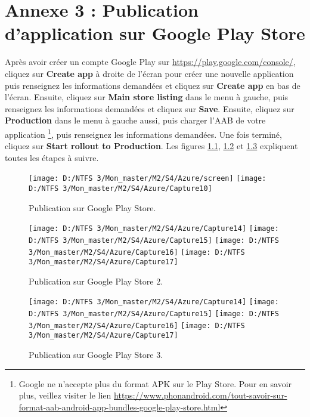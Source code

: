 \chapter{Annexe 3 : Publication d’application sur Google Play Store}
\label{chap:annexe3}

Après avoir créer un compte Google Play sur \href{https://play.google.com/console/}{https://play.google.com/console/}, cliquez sur \textbf{Create app} à droite de l'écran pour créer une nouvelle application puis renseignez les informations demandées et cliquez sur \textbf{Create app} en bas de l'écran. Ensuite, cliquez sur \textbf{Main store listing} dans le menu à gauche, puis renseignez les informations demandées et cliquez sur \textbf{Save}. Ensuite, cliquez sur \textbf{Production} dans le menu à gauche aussi, puis charger l'\gls{AAB} de votre application \footnote{Google ne n'accepte plus du format APK sur le Play Store. Pour en savoir plus, veillez visiter le lien \href{https://www.phonandroid.com/tout-savoir-sur-format-aab-android-app-bundles-google-play-store.html}{https://www.phonandroid.com/tout-savoir-sur-format-aab-android-app-bundles-google-play-store.html}}, puis renseignez les informations demandées. Une fois terminé, cliquez sur \textbf{Start rollout to Production}. Les figures \ref{Figure 9.1}, \ref{Figure 9.2} et \ref{Figure 9.3} expliquent toutes les étapes à suivre.
\begin{figure}[!ht]
	\texttt{[image: D:/NTFS 3/Mon\_master/M2/S4/Azure/screen]}
	\texttt{[image: D:/NTFS 3/Mon\_master/M2/S4/Azure/Capture10]}
	\centering
	\caption{Publication sur Google Play Store.}
	\label{Figure 9.1}
\end{figure}
\begin{figure}[!ht]
	\texttt{[image: D:/NTFS 3/Mon\_master/M2/S4/Azure/Capture14]}
	\texttt{[image: D:/NTFS 3/Mon\_master/M2/S4/Azure/Capture15]}
	\texttt{[image: D:/NTFS 3/Mon\_master/M2/S4/Azure/Capture16]}
	\texttt{[image: D:/NTFS 3/Mon\_master/M2/S4/Azure/Capture17]}
	\centering
	\caption{Publication sur Google Play Store 2.}
	\label{Figure 9.2}
\end{figure}
\begin{figure}[!ht]
	\texttt{[image: D:/NTFS 3/Mon\_master/M2/S4/Azure/Capture14]}
	\texttt{[image: D:/NTFS 3/Mon\_master/M2/S4/Azure/Capture15]}
	\texttt{[image: D:/NTFS 3/Mon\_master/M2/S4/Azure/Capture16]}
	\texttt{[image: D:/NTFS 3/Mon\_master/M2/S4/Azure/Capture17]}
	\centering
	\caption{Publication sur Google Play Store 3.}
	\label{Figure 9.3}
\end{figure}
